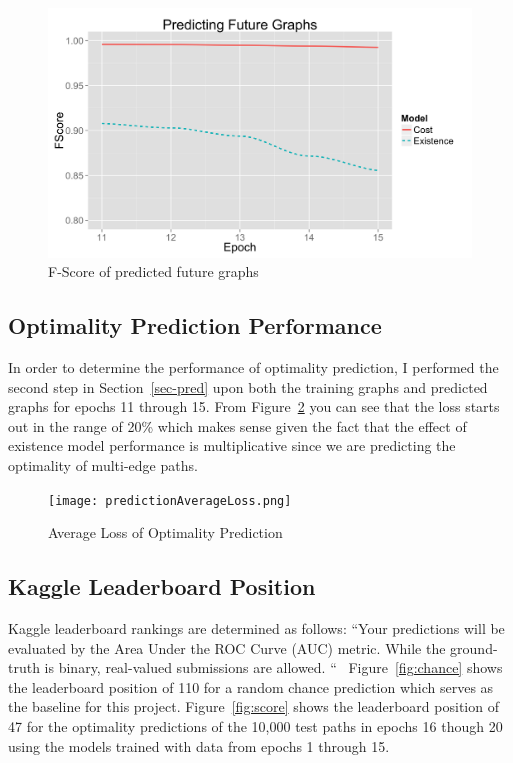 \documentclass{article} %
\begin{document}
\begin{figure}
  \begin{center}
    \includegraphics[scale=.1]{predictingFutureGraphs.png}
  \end{center}
  \caption{F-Score of predicted future graphs}
  \label{fig:fscore}
\end{figure}

\subsection{Optimality Prediction Performance}

In order to determine the performance of optimality prediction, I performed
the second step in Section~\ref{sec-pred} upon both the training graphs and
predicted graphs for epochs 11 through 15.  From Figure~\ref{fig:optloss}
you can see that the loss starts out in the range of 20\% which makes sense
given the fact that the effect of existence model performance is
multiplicative since we are predicting the optimality of multi-edge paths.

\begin{figure}
  \begin{center}
    \texttt{[image: predictionAverageLoss.png]}
  \end{center}
  \caption{Average Loss of Optimality Prediction}
  \label{fig:optloss}
\end{figure}

\subsection{Kaggle Leaderboard Position}

Kaggle leaderboard rankings are determined as follows: ``Your predictions
will be evaluated by the Area Under the ROC Curve (AUC) metric.  While the
ground-truth is binary, real-valued submissions are allowed. ``~\cite{kaggle}
Figure~\ref{fig:chance} shows the leaderboard position of 110 for a random
chance prediction which serves as the baseline for this project.
Figure~\ref{fig:score} shows the leaderboard position of 47 for the
optimality predictions of the 10,000 test paths in epochs 16 though
20 using the models trained with data from epochs 1 through 15.
\end{document}

